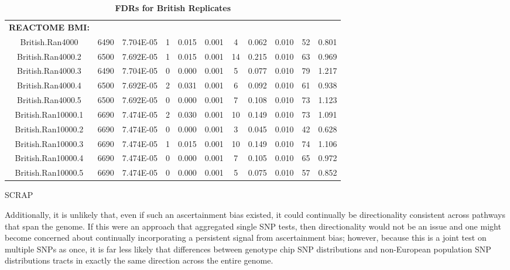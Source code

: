 \documentclass[12pt, a4paper]{article}
\begin{document}
\begin{landscape}
\begin{table}[ht]
\begin{tabular}{ccccccccccc}
  \\
  \textbf{REACTOME BMI:} & & & & & & & & & \\
British.Ran4000 & 6490 & 7.704E-05 & 1 & 0.015 & 0.001 & 4 & 0.062 & 0.010 & 52 & 0.801 \\
  British.Ran4000.2 & 6500 & 7.692E-05 & 1 & 0.015 & 0.001 & 14 & 0.215 & 0.010 & 63 & 0.969 \\
  British.Ran4000.3 & 6490 & 7.704E-05 & 0 & 0.000 & 0.001 & 5 & 0.077 & 0.010 & 79 & 1.217 \\
  British.Ran4000.4 & 6500 & 7.692E-05 & 2 & 0.031 & 0.001 & 6 & 0.092 & 0.010 & 61 & 0.938 \\
  British.Ran4000.5 & 6500 & 7.692E-05 & 0 & 0.000 & 0.001 & 7 & 0.108 & 0.010 & 73 & 1.123 \\
  British.Ran10000.1 & 6690 & 7.474E-05 & 2 & 0.030 & 0.001 & 10 & 0.149 & 0.010 & 73 & 1.091 \\
  British.Ran10000.2 & 6690 & 7.474E-05 & 0 & 0.000 & 0.001 & 3 & 0.045 & 0.010 & 42 & 0.628 \\
  British.Ran10000.3 & 6690 & 7.474E-05 & 1 & 0.015 & 0.001 & 10 & 0.149 & 0.010 & 74 & 1.106 \\
  British.Ran10000.4 & 6690 & 7.474E-05 & 0 & 0.000 & 0.001 & 7 & 0.105 & 0.010 & 65 & 0.972 \\
  British.Ran10000.5 & 6690 & 7.474E-05 & 0 & 0.000 & 0.001 & 5 & 0.075 & 0.010 & 57 & 0.852 \\
   \hline
\end{tabular}
\caption[TBD]{\textbf{FDRs for British Replicates}}
\label{InterPath-Supp-Tables-BritReps-FDRs-pt2}
\end{table}
\end{landscape}
\clearpage

\begingroup


\endgroup


\iffalse

SCRAP

Additionally, it is unlikely that, even if such an ascertainment bias existed, it could continually be directionality consistent across pathways that span the genome. If this were an approach that aggregated single SNP tests, then directionality would not be an issue and one might become concerned about continually incorporating a persistent signal from ascertainment bias; however, because this is a joint test on multiple SNPs as once, it is far less likely that differences between genotype chip SNP distributions and non-European population SNP distributions tracts in exactly the same direction across the entire genome.
\end{document}
